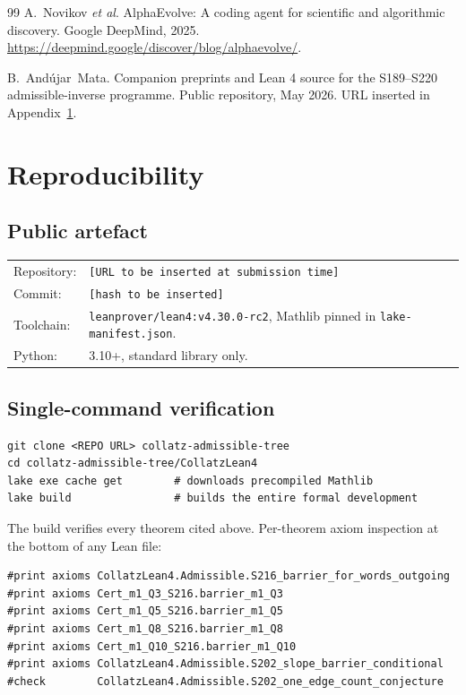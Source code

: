 \documentclass[11pt,a4paper]{article}
\theoremstyle{plain}
\theoremstyle{definition}
\begin{document}
\begin{thebibliography}{99}
A.~Novikov \emph{et al}.
\newblock AlphaEvolve: A coding agent for scientific and algorithmic
discovery.
\newblock Google DeepMind, 2025. \url{https://deepmind.google/discover/blog/alphaevolve/}.

B.~And\'ujar~Mata.
\newblock Companion preprints and Lean 4 source for the S189--S220
admissible-inverse programme.
\newblock Public repository, May 2026. URL inserted in
Appendix~\ref{app:reprod}.

\end{thebibliography}

\appendix

\section{Reproducibility}\label{app:reprod}

\subsection*{Public artefact}

\begin{tabular}{ll}
Repository: & \texttt{[URL to be inserted at submission time]} \\
Commit:     & \texttt{[hash to be inserted]} \\
Toolchain:  & \texttt{leanprover/lean4:v4.30.0-rc2}, Mathlib pinned in
              \texttt{lake-manifest.json}. \\
Python:     & 3.10+, standard library only. \\
\end{tabular}

\subsection*{Single-command verification}

\begin{lstlisting}
git clone <REPO URL> collatz-admissible-tree
cd collatz-admissible-tree/CollatzLean4
lake exe cache get        # downloads precompiled Mathlib
lake build                # builds the entire formal development
\end{lstlisting}

The build verifies every theorem cited above. Per-theorem axiom
inspection at the bottom of any Lean file:

\begin{lstlisting}
#print axioms CollatzLean4.Admissible.S216_barrier_for_words_outgoing
#print axioms Cert_m1_Q3_S216.barrier_m1_Q3
#print axioms Cert_m1_Q5_S216.barrier_m1_Q5
#print axioms Cert_m1_Q8_S216.barrier_m1_Q8
#print axioms Cert_m1_Q10_S216.barrier_m1_Q10
#print axioms CollatzLean4.Admissible.S202_slope_barrier_conditional
#check        CollatzLean4.Admissible.S202_one_edge_count_conjecture
\end{lstlisting}
\end{document}
